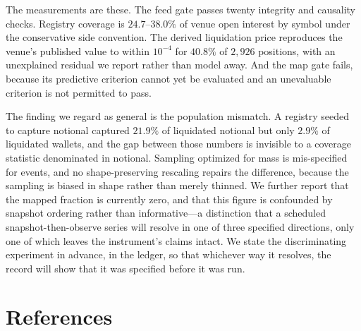 \documentclass[11pt,a4paper]{article}
\theoremstyle{definition}
\theoremstyle{plain}
\begin{document}
The measurements are these. The feed gate passes twenty integrity and causality checks. Registry
coverage is $24.7$--$38.0\%$ of venue open interest by symbol under the conservative side convention.
The derived liquidation price reproduces the venue's published value to within $10^{-4}$ for $40.8\%$
of $2{,}926$ positions, with an unexplained residual we report rather than model away. And the map
gate fails, because its predictive criterion cannot yet be evaluated and an unevaluable criterion is
not permitted to pass.

The finding we regard as general is the population mismatch. A registry seeded to capture notional
captured $21.9\%$ of liquidated notional but only $2.9\%$ of liquidated wallets, and the gap between
those numbers is invisible to a coverage statistic denominated in notional. Sampling optimized for
mass is mis-specified for events, and no shape-preserving rescaling repairs the difference, because
the sampling is biased in shape rather than merely thinned. We further report that the mapped
fraction is currently zero, and that this figure is confounded by snapshot ordering rather than
informative---a distinction that a scheduled snapshot-then-observe series will resolve in one of three
specified directions, only one of which leaves the instrument's claims intact. We state the
discriminating experiment in advance, in the ledger, so that whichever way it resolves, the record
will show that it was specified before it was run.

\section*{References}
\end{document}
